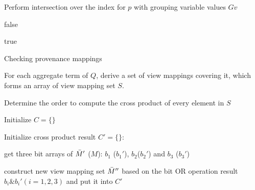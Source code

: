 \begin{example}
\begin{algorithm}[h!]
{{{        }
        
        Perform intersection over the index for $p$ with grouping variable values $Gv$
        
        {
            \Return false
        }
    }
    
}

\Return true



 \caption{Checking provenance mappings}
 \label{reasoning_valid_view_mappings}
 \end{algorithm}





\begin{algorithm}[h!] 
\footnotesize

 
 For each aggregate term of $Q$, derive a set of view mappings covering it, which forms an array of view mapping set $S$. 
 
 
 Determine the order to compute the cross product of every element in $S$
 
 Initialize $C = \{\}$
 
 {
    
    Initialize cross product result $C' = \{\}$:
    
    {
        {
            get three bit arrays of $\Bar{M}'$ ($M$): $b_1$ ($b_1'$), $b_2$($b_2'$) and $b_3$ ($b_3'$)
            
            construct new view mapping set $\Bar{M}''$ based on the bit OR operation result $b_i \& b_i' (i=1,2,3)$ and put it into $C'$
        }
    }
    
}
\end{algorithm}
\end{example}
